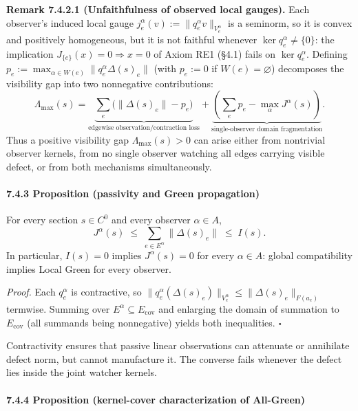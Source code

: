 \documentclass[
  11pt,
]{article}
\begin{document}
\textbf{Remark 7.4.2.1 (Unfaithfulness of observed local gauges).} Each observer's induced local gauge \(j_e^\alpha(v):=\lVert q_e^\alpha v\rVert_{V_e^\alpha}\) is a seminorm, so it is convex and positively homogeneous, but it is not faithful whenever \(\ker q_e^\alpha\neq\{0\}\): the implication \(J_{\{e\}}(x)=0\Rightarrow x=0\) of Axiom RE1 (§4.1) fails on \(\ker q_e^\alpha\). Defining \(p_e:=\max_{\alpha\in W(e)}\lVert q_e^\alpha\Delta(s)_e\rVert\) (with \(p_e:=0\) if \(W(e)=\varnothing\)) decomposes the visibility gap into two nonnegative contributions:
\[
\Lambda_{\max}(s)
=\underbrace{\sum_e\bigl(\lVert\Delta(s)_e\rVert-p_e\bigr)}_{\text{edgewise observation/contraction loss}}
+\underbrace{\left(\sum_e p_e-\max_\alpha J^\alpha(s)\right)}_{\text{single-observer domain fragmentation}}.
\]
Thus a positive visibility gap \(\Lambda_{\max}(s)>0\) can arise either from nontrivial observer kernels, from no single observer watching all edges carrying visible defect, or from both mechanisms simultaneously.

\paragraph{7.4.3 Proposition (passivity and Green propagation)}\label{proposition-passivity-and-green-propagation}

For every section \(s\in C^0\) and every observer \(\alpha\in A\),
\[
J^\alpha(s)\;\le\;\sum_{e\in E^\alpha}\lVert\Delta(s)_e\rVert\;\le\;I(s).
\]
In particular, \(I(s)=0\) implies \(J^\alpha(s)=0\) for every \(\alpha\in A\): global compatibility implies Local Green for every observer.

\emph{Proof.} Each \(q_e^\alpha\) is contractive, so \(\lVert q_e^\alpha(\Delta(s)_e)\rVert_{V_e^\alpha}\le\lVert\Delta(s)_e\rVert_{F(a_e)}\) termwise. Summing over \(E^\alpha\subseteq E_{\mathrm{cov}}\) and enlarging the domain of summation to \(E_{\mathrm{cov}}\) (all summands being nonnegative) yields both inequalities. \(\square\)

Contractivity ensures that passive linear observations can attenuate or annihilate defect norm, but cannot manufacture it. The converse fails whenever the defect lies inside the joint watcher kernels.

\paragraph{7.4.4 Proposition (kernel-cover characterization of All-Green)}\label{proposition-kernel-cover-characterization-of-all-green}
\end{document}
